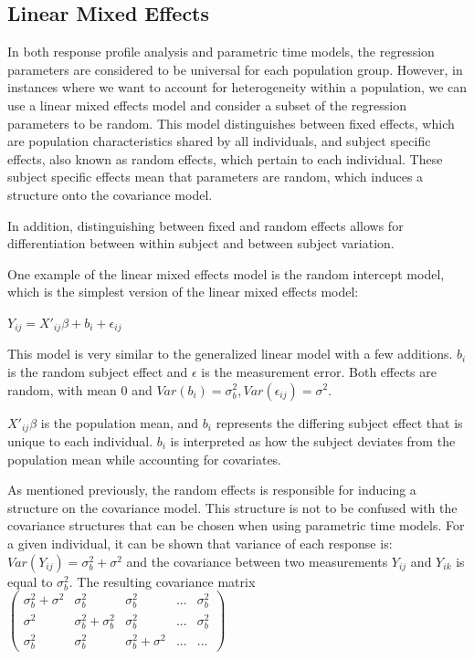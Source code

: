 \documentclass[12pt, twoside]{amherstthesis}
\theoremstyle{definition}
\theoremstyle{definition}
\theoremstyle{definition}
\theoremstyle{remark}
\begin{document}
\hypertarget{linear-mixed-effects}{%
\subsection{Linear Mixed Effects}\label{linear-mixed-effects}}

In both response profile analysis and parametric time models, the regression parameters are considered to be universal for each population group. However, in instances where we want to account for heterogeneity within a population, we can use a linear mixed effects model and consider a subset of the regression parameters to be random. This model distinguishes between fixed effects, which are population characteristics shared by all individuals, and subject specific effects, also known as random effects, which pertain to each individual. These subject specific effects mean that parameters are random, which induces a structure onto the covariance model.

In addition, distinguishing between fixed and random effects allows for differentiation between within subject and between subject variation.

One example of the linear mixed effects model is the random intercept model, which is the simplest version of the linear mixed effects model:

\(Y_{ij} = X'_{ij}\beta + b_i + \epsilon_{ij}\)

This model is very similar to the generalized linear model with a few additions. \(b_i\) is the random subject effect and \(\epsilon\) is the measurement error. Both effects are random, with mean 0 and \(Var(b_i) = \sigma^2_b, Var(\epsilon_{ij})=\sigma^2\).

\(X'_{ij}\beta\) is the population mean, and \(b_i\) represents the differing subject effect that is unique to each individual. \(b_i\) is interpreted as how the subject deviates from the population mean while accounting for covariates.

As mentioned previously, the random effects is responsible for inducing a structure on the covariance model. This structure is not to be confused with the covariance structures that can be chosen when using parametric time models. For a given individual, it can be shown that variance of each response is:
\(Var(Y_{ij}) = \sigma^2_b + \sigma^2\) and the covariance between two measurements \(Y_{ij}\) and \(Y_{ik}\) is equal to \(\sigma^2_b\). The resulting covariance matrix \(\begin{pmatrix} \sigma^2_b + \sigma^2 & \sigma^2_b & \sigma^2_b & ... & \sigma^2_b \\ \sigma^2 & \sigma^2_b + \sigma^2_b & \sigma^2_b & ... & \sigma^2_b \\ \sigma^2_b & \sigma^2_b & \sigma^2_b + \sigma^2 & ...& ... \end{pmatrix}\)
\end{document}
